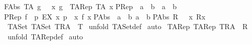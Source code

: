 \begin{isabellebody}
{\isachardoublequoteopen}FAbs\ TA\ g\ {\isacharequal}{\isacharequal}\ {\isacharparenleft}{\isacharpercent}\ x{\isachardot}\ g\ {\isacharpercent}{\isacharcircum}\ {\isacharparenleft}TARep\ TA\ x{\isacharparenright}{\isacharparenright}{\isachardoublequoteclose}\isanewline
\isanewline
PRep\ {\isacharcolon}{\isacharcolon}\ {\isachardoublequoteopen}{\isacharbrackleft}{\isacharprime}a\ {\isacharequal}{\isachargreater}\ {\isacharprime}b{\isacharbrackright}\ {\isacharequal}{\isachargreater}\ {\isacharparenleft}{\isacharprime}a\ {\isacharless}{\isacharequal}{\isachargreater}\ {\isacharprime}b{\isacharparenright}{\isachardoublequoteclose}\isanewline
{\isachardoublequoteopen}PRep\ f\ {\isacharequal}{\isacharequal}\ {\isacharbraceleft}p{\isachardot}\ EX\ x{\isachardot}\ p\ {\isacharequal}\ {\isacharparenleft}x{\isacharcomma}\ f\ x{\isacharparenright}{\isacharbraceright}{\isachardoublequoteclose}\isanewline
\isanewline
PAbs\ {\isacharcolon}{\isacharcolon}\ {\isachardoublequoteopen}{\isacharbrackleft}{\isacharparenleft}{\isacharprime}a\ {\isacharless}{\isacharequal}{\isachargreater}\ {\isacharprime}b{\isacharparenright}{\isacharcomma}\ {\isacharprime}a{\isacharbrackright}\ {\isacharequal}{\isachargreater}\ {\isacharprime}b{\isachardoublequoteclose}\isanewline
{\isachardoublequoteopen}PAbs\ R\ {\isacharequal}{\isacharequal}\ {\isacharparenleft}{\isacharpercent}\ x{\isachardot}\ R{\isacharpercent}{\isacharcircum}x{\isacharparenright}{\isachardoublequoteclose}\isanewline
\isanewline
\isanewline
{}\isamarkupfalse%
\ TASet{\isacharcolon}\ {\isachardoublequoteopen}TASet\ {\isacharparenleft}T{\isacharcomma}R{\isacharcomma}A{\isacharparenright}\ {\isacharequal}\ T{\isachardoublequoteclose}\isanewline
%
\isadelimproof
%
\endisadelimproof
%
\isatagproof
{}\isamarkupfalse%
\ {\isacharparenleft}unfold\ TASet{\isacharunderscore}def{\isacharparenright}\isanewline
{}\isamarkupfalse%
\ auto\isanewline
{}\isamarkupfalse%
%
\endisatagproof
{\isafoldproof}%
%
\isadelimproof
\isanewline
%
\endisadelimproof
\isanewline
{}\isamarkupfalse%
\ TARep{\isacharcolon}\ {\isachardoublequoteopen}TARep\ {\isacharparenleft}T{\isacharcomma}R{\isacharcomma}A{\isacharparenright}\ {\isacharequal}\ R{\isachardoublequoteclose}\isanewline
%
\isadelimproof
%
\endisadelimproof
%
\isatagproof
{}\isamarkupfalse%
\ {\isacharparenleft}unfold\ TARep{\isacharunderscore}def{\isacharparenright}\isanewline
{}\isamarkupfalse%
\ auto\isanewline
{}\isamarkupfalse%
%
\endisatagproof
{\isafoldproof}%

\end{isabellebody}
